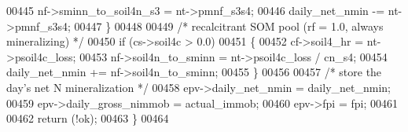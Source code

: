 \begin{DoxyCode}
00445         nf->sminn\_to\_soil4n\_s3 = nt->pmnf\_s3s4;
00446         daily\_net\_nmin -= nt->pmnf\_s3s4;
00447     \}
00448     
00449     \textcolor{comment}{/* recalcitrant SOM pool (rf = 1.0, always mineralizing) */}
00450     \textcolor{keywordflow}{if} (cs->soil4c > 0.0)
00451     \{
00452         cf->soil4\_hr = nt->psoil4c\_loss;
00453         nf->soil4n\_to\_sminn = nt->psoil4c\_loss / cn\_s4;
00454         daily\_net\_nmin += nf->soil4n\_to\_sminn;
00455     \}
00456     
00457     \textcolor{comment}{/* store the day's net N mineralization */}
00458     epv->daily\_net\_nmin = daily\_net\_nmin;
00459     epv->daily\_gross\_nimmob = actual\_immob;
00460     epv->fpi = fpi;
00461     
00462     \textcolor{keywordflow}{return} (!ok);
00463 \}
00464 
\end{DoxyCode}
